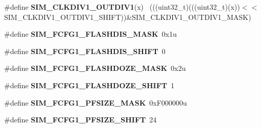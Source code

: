 \begin{DoxyCompactItemize}
\item 
\hypertarget{group___s_i_m___register___masks_gae57b95ee6dc15af2d142e6e1b193383d}{}\#define {\bfseries S\+I\+M\+\_\+\+C\+L\+K\+D\+I\+V1\+\_\+\+O\+U\+T\+D\+I\+V1}(x)                                  ~(((uint32\+\_\+t)(((uint32\+\_\+t)(x))$<$$<$S\+I\+M\+\_\+\+C\+L\+K\+D\+I\+V1\+\_\+\+O\+U\+T\+D\+I\+V1\+\_\+\+S\+H\+I\+F\+T))\&S\+I\+M\+\_\+\+C\+L\+K\+D\+I\+V1\+\_\+\+O\+U\+T\+D\+I\+V1\+\_\+\+M\+A\+S\+K)\label{group___s_i_m___register___masks_gae57b95ee6dc15af2d142e6e1b193383d}

\item 
\hypertarget{group___s_i_m___register___masks_gad2bcfe2db5329ab186bb8393228f24cc}{}\#define {\bfseries S\+I\+M\+\_\+\+F\+C\+F\+G1\+\_\+\+F\+L\+A\+S\+H\+D\+I\+S\+\_\+\+M\+A\+S\+K}~0x1u\label{group___s_i_m___register___masks_gad2bcfe2db5329ab186bb8393228f24cc}

\item 
\hypertarget{group___s_i_m___register___masks_ga1a8408a876a3a68b16780a1d45d539df}{}\#define {\bfseries S\+I\+M\+\_\+\+F\+C\+F\+G1\+\_\+\+F\+L\+A\+S\+H\+D\+I\+S\+\_\+\+S\+H\+I\+F\+T}~0\label{group___s_i_m___register___masks_ga1a8408a876a3a68b16780a1d45d539df}

\item 
\hypertarget{group___s_i_m___register___masks_ga5922dc31ee4c05aba3cfeaa4474fddb8}{}\#define {\bfseries S\+I\+M\+\_\+\+F\+C\+F\+G1\+\_\+\+F\+L\+A\+S\+H\+D\+O\+Z\+E\+\_\+\+M\+A\+S\+K}~0x2u\label{group___s_i_m___register___masks_ga5922dc31ee4c05aba3cfeaa4474fddb8}

\item 
\hypertarget{group___s_i_m___register___masks_ga3f6c60d4baf2c592dbd5c43974bd19f3}{}\#define {\bfseries S\+I\+M\+\_\+\+F\+C\+F\+G1\+\_\+\+F\+L\+A\+S\+H\+D\+O\+Z\+E\+\_\+\+S\+H\+I\+F\+T}~1\label{group___s_i_m___register___masks_ga3f6c60d4baf2c592dbd5c43974bd19f3}

\item 
\hypertarget{group___s_i_m___register___masks_ga5adf627ba4cd9516ebf3e0a6d33aa7c5}{}\#define {\bfseries S\+I\+M\+\_\+\+F\+C\+F\+G1\+\_\+\+P\+F\+S\+I\+Z\+E\+\_\+\+M\+A\+S\+K}~0x\+F000000u\label{group___s_i_m___register___masks_ga5adf627ba4cd9516ebf3e0a6d33aa7c5}

\item 
\hypertarget{group___s_i_m___register___masks_gaec8960bc114f5539e22701491dcf58f7}{}\#define {\bfseries S\+I\+M\+\_\+\+F\+C\+F\+G1\+\_\+\+P\+F\+S\+I\+Z\+E\+\_\+\+S\+H\+I\+F\+T}~24\label{group___s_i_m___register___masks_gaec8960bc114f5539e22701491dcf58f7}


\end{DoxyCompactItemize}
